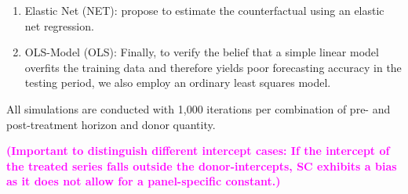 \begin{itemize}
\begin{enumerate}
		\item Elastic Net (NET): \cite{doudchenko:2016} propose to estimate the counterfactual using an elastic net regression. 
		\item OLS-Model (OLS): Finally, to verify the belief that a simple linear model overfits the training data and therefore yields poor forecasting accuracy in the testing period, we also employ an ordinary least squares model.
	\end{enumerate}
\end{itemize}

All simulations are conducted with 1,000 iterations per combination of pre- and post-treatment horizon and donor quantity. 

\textcolor{magenta}{\textbf{(Important to distinguish different intercept cases: If the intercept of the treated series falls outside the donor-intercepts, SC exhibits a bias as it does not allow for a panel-specific constant.)}} 

